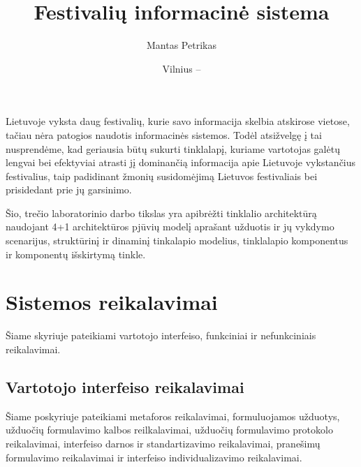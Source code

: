 \documentclass{VUMIFPSkursinis}
\title{Festivalių informacinė sistema}
\author{Mantas Petrikas}
\date{Vilnius – \the\year}
\begin{document}
\maketitle

\tableofcontents

Lietuvoje vyksta daug festivalių, kurie savo informacija skelbia atskirose vietose, tačiau nėra patogios naudotis informacinės sistemos. 
Todėl atsižvelgę į tai nusprendėme, kad geriausia būtų sukurti tinklalapį, kuriame vartotojas galėtų lengvai bei efektyviai atrasti jį dominančią informacija apie Lietuvoje vykstančius festivalius, taip padidinant žmonių susidomėjimą Lietuvos festivaliais bei prisidedant prie jų garsinimo.

Šio, trečio laboratorinio darbo tikslas yra apibrėžti tinklalio architektūrą naudojant 4+1 architektūros pjūvių modelį aprašant užduotis ir jų vykdymo scenarijus, struktūrinį ir dinaminį tinkalapio modelius, tinklalapio komponentus ir komponentų išskirtymą tinkle.  
\section{Sistemos reikalavimai}
Šiame skyriuje pateikiami vartotojo interfeiso, funkciniai ir nefunkciniais reikalavimai.
\subsection{Vartotojo interfeiso reikalavimai}
Šiame poskyriuje pateikiami metaforos reikalavimai, formuluojamos užduotys, užduočių formulavimo kalbos reilkalavimai, užduočių formulavimo protokolo reikalavimai, interfeiso darnos ir standartizavimo reikalavimai, pranešimų formulavimo reikalavimai ir interfeiso individualizavimo reikalavimai. 
\end{document}
